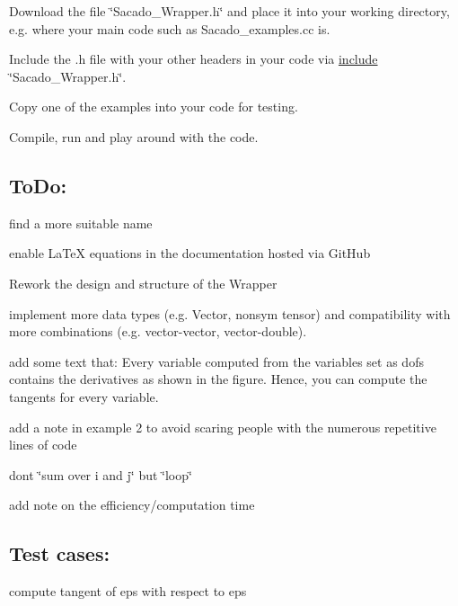 \begin{DoxyEnumerate}
\item Download the file \char`\"{}\+Sacado\+\_\+\+Wrapper.\+h\char`\"{} and place it into your working directory, e.\+g. where your main code such as Sacado\+\_\+examples.\+cc is.
\item Include the .h file with your other headers in your code via \textquotesingle{}\hyperlink{CMakeCache_8txt_a986ccfc90e04633694fe6cff5472be19}{include} \char`\"{}\+Sacado\+\_\+\+Wrapper.\+h\char`\"{}\textquotesingle{}.
\item Copy one of the examples into your code for testing.
\item Compile, run and play around with the code.
\end{DoxyEnumerate}

\subsection*{To\+Do\+:}


\begin{DoxyItemize}
\item find a more suitable name
\item enable La\+TeX equations in the documentation hosted via Git\+Hub
\item Rework the design and structure of the Wrapper
\item implement more data types (e.\+g. Vector, nonsym tensor) and compatibility with more combinations (e.\+g. vector-\/vector, vector-\/double).
\item add some text that\+: Every variable computed from the variables set as dofs contains the derivatives as shown in the figure. Hence, you can compute the tangents for every variable.
\item add a note in example 2 to avoid scaring people with the numerous repetitive lines of code
\item don\textquotesingle{}t \char`\"{}sum over i and j\char`\"{} but \char`\"{}loop\char`\"{}
\item add note on the efficiency/computation time
\end{DoxyItemize}

\subsection*{Test cases\+:}


\begin{DoxyItemize}
\item compute tangent of eps with respect to eps 
\end{DoxyItemize}
